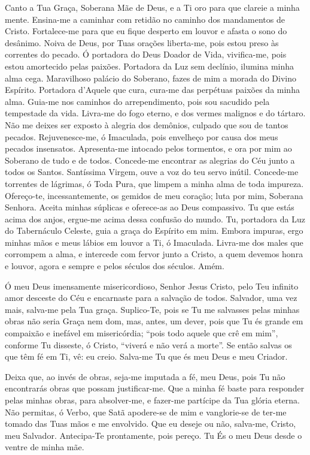 \documentclass{subfiles}
\begin{document}

Canto a Tua Graça, Soberana Mãe de Deus, e a Ti oro para que clareie
a minha mente. Ensina-me a caminhar com retidão no caminho dos
mandamentos de Cristo. Fortalece-me para que eu fique desperto em louvor
e afasta o sono do desânimo. Noiva de Deus, por Tuas orações liberta-me, pois
estou preso às correntes do pecado. Ó portadora do Deus Doador de Vida,
vivifica-me, pois estou amortecido pelas paixões. Portadora da Luz sem
declínio, ilumina minha alma cega. Maravilhoso palácio do Soberano, fazes de
mim a morada do Divino Espírito. Portadora d’Aquele que cura, cura-me das
perpétuas paixões da minha alma. Guia-me nos caminhos do arrependimento,
pois sou sacudido pela tempestade da vida. Livra-me do fogo eterno, e dos
vermes malignos e do tártaro. Não me deixes ser exposto à alegria dos
demônios, culpado que sou de tantos pecados. Rejuvenesce-me, ó Imaculada,
pois envelheço por causa dos meus pecados insensatos. Apresenta-me
intocado pelos tormentos, e ora por mim ao Soberano de tudo e de todos.
Concede-me encontrar as alegrias do Céu junto a todos os Santos. Santíssima
Virgem, ouve a voz do teu servo inútil. Concede-me torrentes de lágrimas, ó
Toda Pura, que limpem a minha alma de toda impureza. Ofereço-te,
incessantemente, os gemidos de meu coração; luta por mim, Soberana
Senhora. Aceita minhas súplicas e oferece-as ao Deus compassivo. Tu que
estás acima dos anjos, ergue-me acima dessa confusão do mundo. Tu,
portadora da Luz do Tabernáculo Celeste, guia a graça do Espírito em mim.
Embora impuras, ergo minhas mãos e meus lábios em louvor a Ti, ó Imaculada.
Livra-me dos males que corrompem a alma, e intercede com fervor junto a
Cristo, a quem devemos honra e louvor, agora e sempre e pelos séculos dos
séculos. Amém.


Ó meu Deus imensamente misericordioso, Senhor Jesus Cristo, pelo Teu infinito
amor desceste do Céu e encarnaste para a salvação de todos. Salvador, uma vez
mais, salva-me pela Tua graça. Suplico-Te, pois se Tu me salvasses pelas minhas
obras não seria Graça nem dom, mas, antes, um dever, pois que Tu és grande em
compaixão e inefável em misericórdia; \enquote{pois todo aquele que crê em mim},
conforme Tu disseste, ó Cristo, \enquote{viverá e não verá a morte}. Se então
salvas os que têm fé em Ti, vê: eu creio. Salva-me Tu que és meu Deus e meu
Criador.

Deixa que, ao invés de obras, seja-me imputada a fé, meu Deus, pois Tu não
encontrarás obras que possam justificar-me. Que a minha fé baste para responder
pelas minhas obras, para absolver-me, e fazer-me partícipe da Tua glória eterna.
Não permitas, ó Verbo, que Satã apodere-se de mim e vanglorie-se de ter-me tomado
das Tuas mãos e me envolvido. Que eu deseje ou não, salva-me, Cristo, meu
Salvador. Antecipa-Te prontamente, pois pereço. Tu És o meu Deus desde o ventre
de minha mãe.
\end{document}

